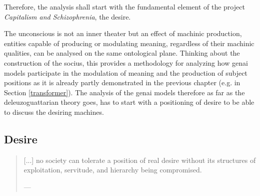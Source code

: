 

Therefore, the analysis shall start with the fundamental element of the project
\textit{Capitalism and Schizophrenia}, the desire.

\begin{orangebox}


	The unconscious is not an inner theater but an effect of machinic production, entities capable of producing or modulating meaning, regardless of their machinic qualities, can be analysed on the same ontological plane. Thinking about the construction of the socius, this provides a methodology for analyzing how \gls{genai} models participate in the modulation of meaning and the production of subject positions as it is already partly demonstrated in the previous chapter (e.g. in Section \ref{transformer}). The analysis of the \gls{genai} models therefore as far as the deleuzoguattarian theory goes, has to start with a positioning of desire to be able to discuss the desiring machines.

\end{orangebox}

\subsection{Desire}\label{desire}

\begin{quote}
	[...] no society can tolerate a position of real desire without its structures of exploitation, servitude, and hierarchy being compromised.

	— \cite[126]{deleuze1983}
\end{quote}




